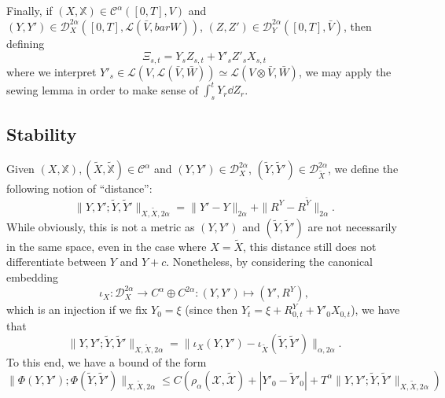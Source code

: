 \documentclass[]{article}
\theoremstyle{definition}
\theoremstyle{definition}
\begin{document}
Finally, if \((X, \mathbb{X}) \in \mathcal{C}^\alpha([0, T], V)\) and 
\((Y, Y') \in \mathcal{D}^{2\alpha}_X([0, T], \mathcal{L}(\bar V, bar W))\),
\((Z, Z') \in \mathcal{D}^{2\alpha}_Y([0, T], \bar V)\), then defining 
\[\Xi_{s, t} = Y_s Z_{s, t} + Y'_s Z'_s X_{s, t}\]
where we interpret \(Y'_s \in \mathcal{L}(V, \mathcal{L}(\bar V, \bar W)) \simeq \mathcal{L}(V \otimes \bar V, \bar W)\), 
we may apply the sewing lemma in order to make sense of 
\(\int_s^t Y_r \dd Z_r\).

\subsection*{Stability}

Given \((X, \mathbb{X}), (\tilde X, \tilde{\mathbb{X}}) \in \mathcal{C}^\alpha\) and \((Y, Y') \in \mathcal{D}^{2\alpha}_X\),
\((\tilde Y, \tilde Y') \in \mathcal{D}^{2\alpha}_{\tilde X}\), we define the following notion of ``distance'':
\[\|Y, Y'; \tilde Y, \tilde Y'\|_{X, \tilde X, 2\alpha} = \|Y' - Y\|_{2\alpha} + \|R^Y - R^{\tilde Y}\|_{2 \alpha}.\]
While obviously, this is not a metric as \((Y, Y')\) and \((\tilde Y, \tilde Y')\) are not necessarily in the same space, 
even in the case where \(X = \tilde X\), this distance still does not differentiate between \(Y\) and \(Y + c\). 
Nonetheless, by considering the canonical embedding 
\[\iota_X : \mathcal{D}^{2\alpha}_X \to C^\alpha \oplus C^{2\alpha} : (Y, Y') \mapsto (Y', R^Y),\]
which is an injection if we fix \(Y_0 = \xi\) (since then \(Y_t = \xi + R^Y_{0, t} + Y'_0 X_{0, t}\)), we have that 
\[\|Y, Y'; \tilde Y, \tilde Y'\|_{X, \tilde X, 2\alpha} = \|\iota_X(Y, Y') - \iota_{\tilde X}(\tilde Y, \tilde Y')\|_{\alpha, 2\alpha}.\]
To this end, we have a bound of the form 
\[\|\Phi(Y, Y'); \Phi(\tilde Y, \tilde Y')\|_{X, \tilde X, 2\alpha} \le 
  C(\rho_\alpha(\mathcal{X}, \tilde{\mathcal{X}}) + |Y'_0 - \tilde{Y}'_0| + T^\alpha \|Y, Y'; \tilde Y, \tilde Y'\|_{X, \tilde X, 2\alpha})\]
\end{document}
